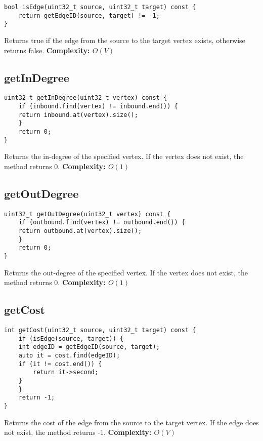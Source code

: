 \documentclass{article}
\begin{document}
\begin{verbatim}
bool isEdge(uint32_t source, uint32_t target) const {
    return getEdgeID(source, target) != -1;
}
\end{verbatim}
Returns true if the edge from the source to the target vertex exists, otherwise returns false.
\textbf{Complexity: $O(V)$}

\subsection*{getInDegree}

\begin{verbatim}
uint32_t getInDegree(uint32_t vertex) const {
    if (inbound.find(vertex) != inbound.end()) {
    return inbound.at(vertex).size();
    }
    return 0;
}
\end{verbatim}

Returns the in-degree of the specified vertex. If the vertex does not exist, the method returns 0.
\textbf{Complexity: $O(1)$}

\subsection*{getOutDegree}

\begin{verbatim}
uint32_t getOutDegree(uint32_t vertex) const {
    if (outbound.find(vertex) != outbound.end()) {
    return outbound.at(vertex).size();
    }
    return 0;
}
\end{verbatim}
Returns the out-degree of the specified vertex. If the vertex does not exist, the method returns 0.
\textbf{Complexity: $O(1)$}

\subsection*{getCost}

\begin{verbatim}
int getCost(uint32_t source, uint32_t target) const {
    if (isEdge(source, target)) {
    int edgeID = getEdgeID(source, target);
    auto it = cost.find(edgeID);
    if (it != cost.end()) {
        return it->second;
    }
    }
    return -1;
}
\end{verbatim}
Returns the cost of the edge from the source to the target vertex. If the edge does not exist, the method returns -1.
\textbf{Complexity: $O(V)$}
\end{document}
